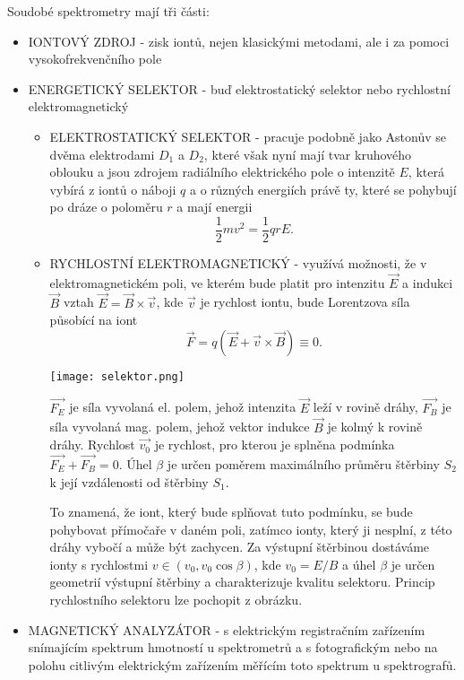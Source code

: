 \documentclass[../../main.tex]{subfiles}
\begin{document}
 
Soudobé spektrometry mají tři části:
\begin{itemize}
	\item IONTOVÝ ZDROJ - zisk iontů, nejen klasickými metodami, ale i za pomoci vysokofrekvenčního pole
	\item ENERGETICKÝ SELEKTOR - buď elektrostatický selektor nebo rychlostní elektromagnetický
	\begin{itemize}
		\item ELEKTROSTATICKÝ SELEKTOR - pracuje podobně jako Astonův se dvěma elektrodami $D_1$ a $D_2$, které však nyní mají tvar kruhového oblouku a jsou zdrojem radiálního elektrického pole o intenzitě $E$, která vybírá z iontů o náboji $q$ a o různých energiích právě ty, které se pohybují po dráze o poloměru $r$ a mají energii
		\begin{equation}
		\dfrac{1}{2} m v^2 = \dfrac{1}{2} qrE.
		\end{equation} 
		\item RYCHLOSTNÍ ELEKTROMAGNETICKÝ - využívá možnosti, že v elektromagnetickém poli, ve kterém bude platit pro intenzitu $\vec{E}$ a indukci $\vec{B}$ vztah $\vec{E} = \vec{B} \times \vec{v}$, kde $\vec{v}$ je rychlost iontu, bude Lorentzova síla působící na iont
		\begin{equation}
		\vec{F} = q(\vec{E} + \vec{v} \times \vec{B}) \equiv 0.
		\end{equation}
		
		\begin{center}
			\texttt{[image: selektor.png]}
		\end{center}
		
		$\vec{F_E}$ je síla vyvolaná el. polem, jehož intenzita $\vec{E}$ leží v rovině dráhy, $\vec{F_B}$ je síla vyvolaná mag. polem, jehož vektor indukce $\vec{B}$ je kolmý k rovině dráhy. Rychlost $\vec{v_0}$ je rychlost, pro kterou je splněna podmínka $\vec{F_E} + \vec{F_B} = 0$. Úhel $\beta$ je určen poměrem maximálního průměru štěrbiny $S_{2}$ k její vzdálenosti od štěrbiny $S_1$.
		
		To znamená, že iont, který bude splňovat tuto podmínku, se bude pohybovat přímočaře v daném poli, zatímco ionty, který ji nesplní, z této dráhy vybočí a může být zachycen. Za výstupní štěrbinou dostáváme ionty s rychlostmi $v \in (v_0, v_0 \cos \beta)$, kde $v_0 = E/B$ a úhel $\beta$ je určen geometrií výstupní štěrbiny a charakterizuje kvalitu selektoru. Princip rychlostního selektoru lze pochopit z obrázku.
	\end{itemize}
	\item MAGNETICKÝ ANALYZÁTOR - s elektrickým registračním zařízením snímajícím spektrum hmotností u spektrometrů a s fotografickým nebo na polohu citlivým  elektrickým zařízením měřícím toto spektrum u spektrografů.
\end{itemize}
\end{document}
